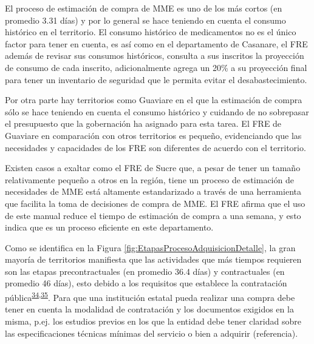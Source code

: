 \documentclass[
]{book}
\begin{document}
El proceso de estimación de compra de MME es uno de los más cortos (en promedio 3.31 días) y por lo general se hace teniendo en cuenta el consumo histórico en el territorio. El consumo histórico de medicamentos no es el único factor para tener en cuenta, es así como en el departamento de Casanare, el FRE además de revisar sus consumos históricos, consulta a sus inscritos la proyección de consumo de cada inscrito, adicionalmente agrega un 20\% a su proyección final para tener un inventario de seguridad que le permita evitar el desabastecimiento.

Por otra parte hay territorios como Guaviare en el que la estimación de compra sólo se hace teniendo en cuenta el consumo histórico y cuidando de no sobrepasar el presupuesto que la gobernación ha asignado para esta tarea. El FRE de Guaviare en comparación con otros territorios es pequeño, evidenciando que las necesidades y capacidades de los FRE son diferentes de acuerdo con el territorio.

Existen casos a exaltar como el FRE de Sucre que, a pesar de tener un tamaño relativamente pequeño a otros en la región, tiene un proceso de estimación de necesidades de MME está altamente estandarizado a través de una herramienta que facilita la toma de decisiones de compra de MME. El FRE afirma que el uso de este manual reduce el tiempo de estimación de compra a una semana, y esto indica que es un proceso eficiente en este departamento.

Como se identifica en la Figura \ref{fig:EtapasProcesoAdquisicionDetalle}, la gran mayoría de territorios manifiesta que las actividades que más tiempos requieren son las etapas precontractuales (en promedio 36.4 días) y contractuales (en promedio 46 días), esto debido a los requisitos que establece la contratación pública\textsuperscript{\protect\hyperlink{ref-CongresodelaRepublicadeColombia1993}{34},\protect\hyperlink{ref-CongresodelaRepublicadeColombia2007}{35}}. Para que una institución estatal pueda realizar una compra debe tener en cuenta la modalidad de contratación y los documentos exigidos en la misma, p.ej. los estudios previos en los que la entidad debe tener claridad sobre las especificaciones técnicas mínimas del servicio o bien a adquirir (referencia).
\end{document}
